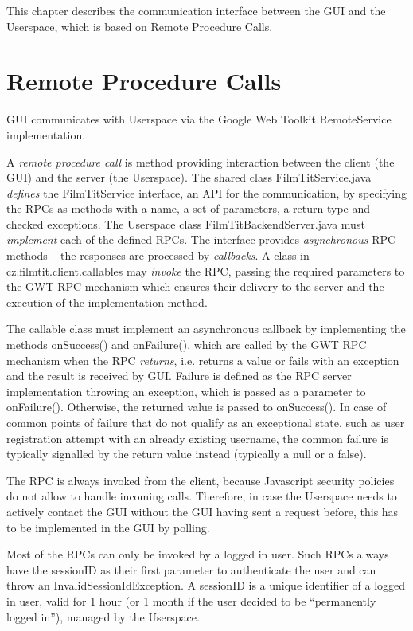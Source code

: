 \label{chap:communication}
\label{sec:communication}

This chapter describes the communication interface between the GUI and the Userspace, which is based on Remote Procedure Calls.

\section{Remote Procedure Calls}
\label{sec:rpc:rpc}

GUI communicates with Userspace via the Google Web Toolkit RemoteService implementation.

A \emph{remote procedure call} is method providing interaction between the client (the GUI) and the server (the Userspace). The shared class FilmTitService.java \emph{defines} the FilmTitService interface, an API for the communication, by specifying the RPCs as methods with a name, a set of parameters, a return type and checked exceptions. The Userspace class FilmTitBackendServer.java must \emph{implement} each of the defined RPCs. The interface provides \emph{asynchronous} RPC methods -- the responses are processed by \emph{callbacks}. A class in cz.filmtit.client.callables may \emph{invoke} the RPC, passing the required parameters to the GWT RPC mechanism which ensures their delivery to the server and the execution of the implementation method.

The callable class must implement an asynchronous callback by implementing the methods onSuccess() and onFailure(), which are called by the GWT RPC mechanism when the RPC \emph{returns}, i.e. returns a value or fails with an exception and the result is received by GUI. Failure is defined as the RPC server implementation throwing an exception, which is passed as a parameter to onFailure(). Otherwise, the returned value is passed to onSuccess().
In case of common points of failure that do not qualify as an exceptional state, such as user registration attempt with an already existing username, the common failure is typically signalled by the return value instead (typically a null or a false).

The RPC is always invoked from the client, because Javascript security policies do not allow to handle incoming calls.
Therefore, in case the Userspace needs to actively contact the GUI without the GUI having sent a request before,
this has to be implemented in the GUI by polling.

Most of the RPCs can only be invoked by a logged in user. Such RPCs always have the sessionID as their first parameter to authenticate the user and can throw an InvalidSessionIdException.
A sessionID is a unique identifier of a logged in user, valid for 1 hour (or 1 month if the user decided to be ``permanently logged in''), managed by the Userspace.

